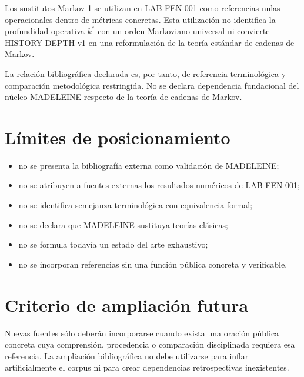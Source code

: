 \begin{observation}
Los sustitutos Markov-1 se utilizan en LAB-FEN-001 como referencias nulas operacionales dentro de métricas concretas. Esta utilización no identifica la profundidad operativa \(k^\ast\) con un orden Markoviano universal ni convierte HISTORY-DEPTH-v1 en una reformulación de la teoría estándar de cadenas de Markov.
\end{observation}

\begin{observation}
La relación bibliográfica declarada es, por tanto, de referencia terminológica y comparación metodológica restringida. No se declara dependencia fundacional del núcleo MADELEINE respecto de la teoría de cadenas de Markov.
\end{observation}

\section*{Límites de posicionamiento}

\begin{itemize}
\item no se presenta la bibliografía externa como validación de MADELEINE;
\item no se atribuyen a fuentes externas los resultados numéricos de LAB-FEN-001;
\item no se identifica semejanza terminológica con equivalencia formal;
\item no se declara que MADELEINE sustituya teorías clásicas;
\item no se formula todavía un estado del arte exhaustivo;
\item no se incorporan referencias sin una función pública concreta y verificable.
\end{itemize}

\section*{Criterio de ampliación futura}

\begin{observation}
Nuevas fuentes sólo deberán incorporarse cuando exista una oración pública concreta cuya comprensión, procedencia o comparación disciplinada requiera esa referencia. La ampliación bibliográfica no debe utilizarse para inflar artificialmente el corpus ni para crear dependencias retrospectivas inexistentes.
\end{observation}
